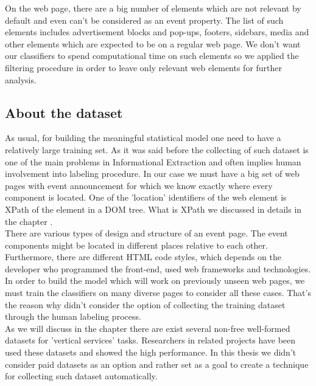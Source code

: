 On the web page, there are a big number of elements which are not relevant by default and even can't be considered as an event property. The list of such elements includes advertisement blocks and pop-ups, footers, sidebars, media and other elements which are expected to be on a regular web page. We don't want our classifiers to spend computational time on such elements so we applied the filtering procedure in order to leave only relevant web elements for further analysis.\\

\subsection{About the dataset}
As usual, for building the meaningful statistical model one need to have a relatively large training set. As it was said before the collecting of such dataset is one of the main problems in Informational Extraction and often implies human involvement into labeling procedure. In our case we must have a big set of web pages with event announcement for which we know exactly where every component is located. One of the 'location' identifiers of the web element is XPath of the element in a DOM tree. What is XPath we discussed in details in the chapter .\\

There are various types of design and structure of an event page. The event components might be located in different places relative to each other. Furthermore, there are different HTML code styles, which depends on the developer who programmed the front-end, used web frameworks and technologies. In order to build the model which will work on previously unseen web pages, we must train the classifiers on many diverse pages to consider all these cases. That's the reason why didn't consider the option of collecting the training dataset through the human labeling process.\\   

As we will discuss in the chapter  there are exist several non-free well-formed datasets for 'vertical services' tasks. Researchers in related projects have been used these datasets and showed the high performance. In this thesis we didn't consider paid datasets as an option and rather set as a goal to create a technique for collecting such dataset automatically.\\

